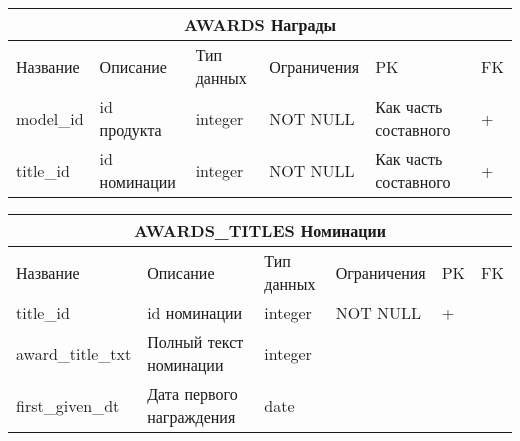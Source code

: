 \documentclass{article}
\begin{document}
\begin{tabular}{ |p{4cm}|p{4cm}|p{2.5cm}|p{3.5cm}|p{2cm}|p{1cm}| }
\hline
\multicolumn{6}{|c|}{AWARDS Награды} \\
\hline
Название & Описание & Тип данных & Ограничения & PK & FK\\
\hline
model\_id                           &   %
id продукта                         &   %
integer                             &   %
NOT NULL                            &   %
Как часть составного                &   %
 +                                  \\  %
\hline
title\_id                           &   %
id номинации                        &   %
integer                             &   %
NOT NULL                            &   %
Как часть составного                &   %
 +                                  \\  %
\hline
\end{tabular}

\begin{tabular}{ |p{4cm}|p{4cm}|p{2.5cm}|p{3.5cm}|p{2cm}|p{1cm}| }
\hline
\multicolumn{6}{|c|}{AWARDS\_TITLES Номинации} \\
\hline
Название & Описание & Тип данных & Ограничения & PK & FK\\
\hline
title\_id                           &   %
id номинации                        &   %
integer                             &   %
NOT NULL                            &   %
 +                                  &   %
                                    \\  %
\hline
award\_title\_txt                   &   %
Полный текст номинации              &   %
integer                             &   %
                                    &   %
                                    &   %
                                    \\  %
\hline
first\_given\_dt                    &   %
Дата первого награждения            &   %
date                                &   %
                                    &   %
                                    &   %
                                    \\  %
\hline
\end{tabular}
\end{document}
